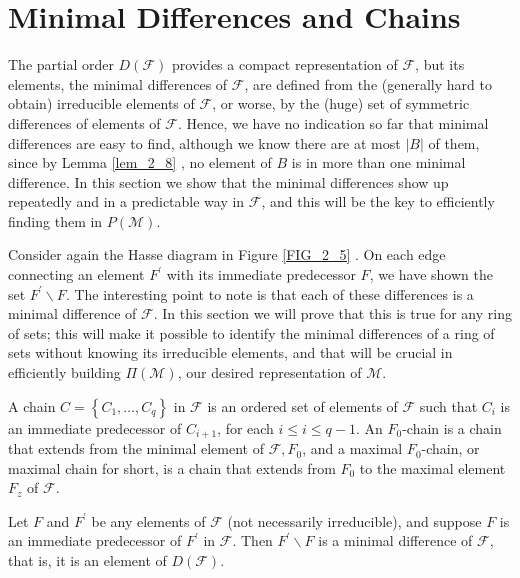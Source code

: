 \section{Minimal Differences and Chains}

The partial order $D(\mathcal{F})$ provides a compact representation of $\mathcal{F}$, but its elements, the minimal differences of $\mathcal{F}$, are defined from the (generally hard to obtain) irreducible elements of $\mathcal{F}$, or worse, by the (huge) set of symmetric differences of elements of $\mathcal{F}$. Hence, we have no indication so far that minimal differences are easy to find, although we know there are at most $|B|$ of them, since by Lemma \ref{lem_2_8} , no element of $B$ is in more than one minimal difference. In this section we show that the minimal differences show up repeatedly and in a predictable way in $\mathcal{F}$, and this will be the key to efficiently finding them in $P(\mathcal{M})$. 

\begin{exmp}\label{exmp_2_9}
Consider again the Hasse diagram in Figure \ref{FIG_2_5} . On each edge connecting an element $F^{\prime}$ with its immediate predecessor $F$, we have shown the set $F^{\prime} \backslash F$. The interesting point to note is that each of these differences is a minimal difference of $\mathcal{F}$. In this section we will prove that this is true for any ring of sets; this will make it possible to identify the minimal differences of a ring of sets without knowing its irreducible elements, and that will be crucial in efficiently building $\Pi(\mathcal{M})$, our desired representation of $\mathcal{M}$.
\end{exmp}

A chain $C=\left\{C_1, \ldots, C_q\right\}$ in $\mathcal{F}$ is an ordered set of elements of $\mathcal{F}$ such that $C_i$ is an immediate predecessor of $C_{i+1}$, for each $i \leq i \leq q-1$. An $F_0$-chain is a chain that extends from the minimal element of $\mathcal{F}, F_0$, and a maximal $F_0$-chain, or maximal chain for short, is a chain that extends from $F_0$ to the maximal element $F_z$ of $\mathcal{F}$.

\begin{lemma}\label{lem_2_11}
Let $F$ and $F^{\prime}$ be any elements of $\mathcal{F}$ (not necessarily irreducible), and suppose $F$ is an immediate predecessor of $F^{\prime}$ in $\mathcal{F}$. Then $F^{\prime} \backslash F$ is a minimal difference of $\mathcal{F}$, that is, it is an element of $D(\mathcal{F})$.
\end{lemma}



